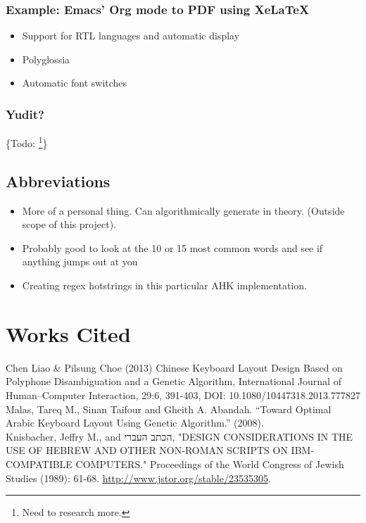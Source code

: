 \documentclass[11pt]{article}
\begin{document}
\subsubsection{Example: Emacs' Org mode to PDF using XeLaTeX}
\label{sec:org9f28cfa}

\begin{itemize}
\item Support for RTL languages and automatic display
\item Polyglossia
\item Automatic font switches
\end{itemize}

\subsubsection{Yudit?}
\label{sec:org0497442}

\{Todo: \footnote{Need to research more.}\}

\subsection{Abbreviations}
\label{sec:orgcb19b82}

\begin{itemize}
\item More of a personal thing. Can algorithmically generate in theory. (Outside scope of this project).
\item Probably good to look at the 10 or 15 most common words and see if anything jumps out at you
\item Creating regex hotstrings in this particular AHK implementation.
\end{itemize}

\section{Works Cited}
\label{sec:orgdc2cee1}

Chen Liao \& Pilsung Choe (2013) Chinese Keyboard Layout Design Based on Polyphone Disambiguation and a Genetic Algorithm, International Journal of Human–Computer Interaction, 29:6, 391-403, DOI: 10.1080/10447318.2013.777827 \\

Malas, Tareq M., Sinan Taifour and Gheith A. Abandah. “Toward Optimal Arabic Keyboard Layout Using Genetic Algorithm.” (2008). \\

Knisbacher, Jeffry M., and \texthebrew{הכתב העברי}, "DESIGN CONSIDERATIONS IN THE USE OF HEBREW AND OTHER NON-ROMAN SCRIPTS ON IBM-COMPATIBLE COMPUTERS." Proceedings of the World Congress of Jewish Studies (1989): 61-68. \url{http://www.jstor.org/stable/23535305}. \\
\end{document}
